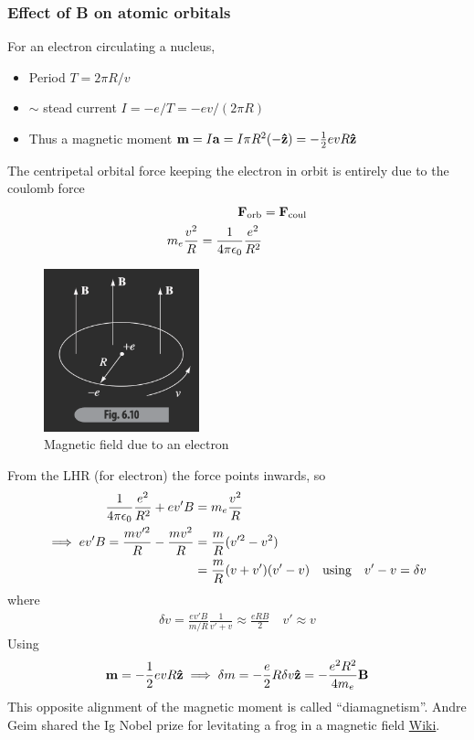 \documentclass[../main.tex]{subfiles}
\begin{document}
\newpage
\subsubsection{Effect of B on atomic orbitals}

For an electron circulating a nucleus,
\begin{itemize}
    \item Period $T = 2\pi R /v$
    \item $\sim$ stead current $I = -e/T = -e v / (2\pi R)$
    \item Thus a magnetic moment $\vb m = I \vb a = I \pi R^2 (-\vu z) = -\frac{1}{2} ev R\vu z$
\end{itemize}
The centripetal orbital force keeping the electron in orbit is entirely due to the coulomb force
\begin{align*}
    \vb F_\text{orb} &= \vb F_\text{coul} \\
    m_e \frac{v^2}{R} = \frac{1}{4\pi\epsilon_0} \frac{e^2}{R^2}
\end{align*}

\begin{figure}[ht]
    \centering
    \includegraphics[width=0.4\textwidth]{fig6_10.png}
    \caption{Magnetic field due to an electron}
    \label{fig:gr6_10}
\end{figure}
From the LHR (for electron) the force points inwards, so
\begin{align*}
    \ke \frac{e^2}{R^2} + ev' B &= m_e \frac{v^2}{R} \\
    \implies ev'B = \frac{mv'^2}{R} - \frac{mv^2}{R} &= \frac{m}{R} (v'^2 - v^2) \\
    &= \frac{m}{R} (v + v')(v' - v) \qusing v' - v = \delta v
\end{align*}
where
\begin{align*}
    \delta v = \frac{ev'B}{m/R} \frac{1}{v' + v} \approx \frac{eRB}{2} \quad v' \approx v
\end{align*}
Using
\begin{align*}
    \vb m = -\frac{1}{2} e v R \vu z \implies \delta m = -\frac{e}{2} R \delta v \vu z = -\frac{e^2 R^2}{4m_e} \vb B 
\end{align*}
This opposite alignment of the magnetic moment is called ``diamagnetism''. Andre Geim shared the Ig Nobel prize for levitating a frog in a magnetic field \href{https://en.wikipedia.org/wiki/Ig_Nobel_Prize#:~:text=The%202000%20Ig%20Nobel%20Prize,Prize%20in%20Physics%20in%202010.}{Wiki}.
\end{document}

